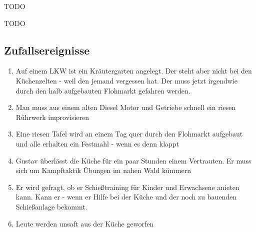\begin{npcBox}[title=Gustav Müller]
    \begin{stunts}
    \item {}
    \end{stunts}

    \begin{stressSection}
    \end{stressSection}
    \begin{tabularx}{\textwidth}{ XX }
    \end{tabularx}

    \begin{consequences}
    \item {}
    \item {}
    \item {}
    \end{consequences}

    \begin{npcDescription}
    TODO
    \end{npcDescription}


    \begin{equipment}
    \item TODO
    \end{equipment}
\end{npcBox}


\subsection{Zufallsereignisse}

\begin{enumerate}
\item Auf einem LKW ist ein Kräutergarten angelegt. Der steht aber nicht bei den Küchenzelten - weil den jemand vergessen hat. Der muss jetzt irgendwie durch den halb aufgebauten Flohmarkt gefahren werden.
\item Man muss aus einem alten Diesel Motor und Getriebe schnell ein riesen Rührwerk improvisieren
\item Eine riesen Tafel wird an einem Tag quer durch den Flohmarkt aufgebaut und alle erhalten ein Festmahl - wenn es denn klappt
\item Gustav überlässt die Küche für ein paar Stunden einem Vertrauten. Er muss sich um Kampftaktik Übungen im nahen Wald kümmern
\item Er wird gefragt, ob er Schießtraining für Kinder und Erwachsene anieten kann. Kann er - wenn er Hilfe bei der Küche und der noch zu bauenden Schießanlage bekommt.
\item Leute werden unsaft aus der Küche geworfen
\end{enumerate}

